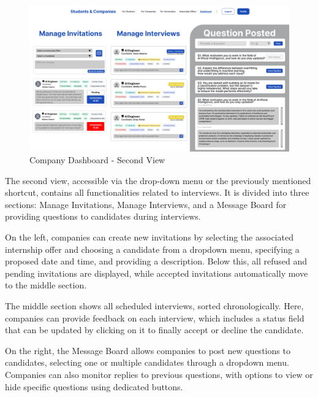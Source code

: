 \begin{figure} [H]
    \begin{center}
        \includegraphics[width=0.9\linewidth]{LaTeXCode/images/UI/Company Dashboard - Second View.png}
        \caption{Company Dashboard - Second View}
        \label{fig: dashboard_company_second}
    \end{center}
\end{figure}

The second view, accessible via the drop-down menu or the previously mentioned shortcut, contains all functionalities related to interviews. It is divided into three sections: Manage Invitations, Manage Interviews, and a Message Board for providing questions to candidates during interviews.

On the left, companies can create new invitations by selecting the associated internship offer and choosing a candidate from a dropdown menu, specifying a proposed date and time, and providing a description. Below this, all refused and pending invitations are displayed, while accepted invitations automatically move to the middle section.

The middle section shows all scheduled interviews, sorted chronologically. Here, companies can provide feedback on each interview, which includes a status field that can be updated by clicking on it to finally accept or decline the candidate.

On the right, the Message Board allows companies to post new questions to candidates, selecting one or multiple candidates through a dropdown menu. Companies can also monitor replies to previous questions, with options to view or hide specific questions using dedicated buttons.

